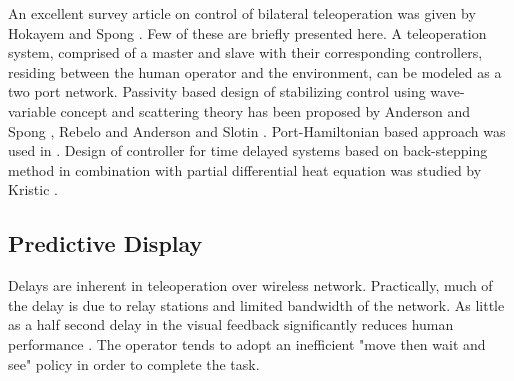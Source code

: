 An excellent survey article on control of bilateral teleoperation was given by Hokayem and Spong \cite{hokayem2006bilateral}. Few of these are briefly presented here. A teleoperation system, comprised of a master and slave with their corresponding controllers, residing between the human operator and the environment,   can be modeled as a two port network. Passivity based design of stabilizing control using  wave-variable concept and scattering theory has been proposed by Anderson and Spong \cite{anderson1989bilateral}, Rebelo \cite{rebelo2015time} and Anderson and Slotin \cite{niemeyer1991stable}.   Port-Hamiltonian  based approach was used in \cite{stramigioli2010novel,stramigioli2005sampled}. Design of controller for time delayed systems  based on back-stepping method in combination with partial differential heat  equation was studied by  Kristic \cite{krstic2009delay}. 



\subsection{Predictive Display}
Delays are inherent in teleoperation over wireless network. Practically, much of the delay is due to relay stations and limited  bandwidth of the network.  As little as a half second delay in the visual feedback significantly reduces human performance \cite{chen2007human}. The operator tends to adopt an inefficient "move then wait and see" policy in order to complete the task.

